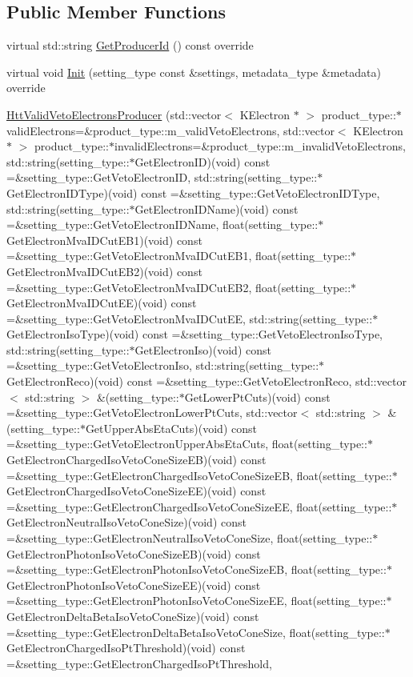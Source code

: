 \subsection*{Public Member Functions}
\begin{DoxyCompactItemize}
\item 
virtual std::string \hyperlink{classHttValidVetoElectronsProducer_a5ac4a1b91978488bbf96d66445f641d7}{GetProducerId} () const override
\item 
virtual void \hyperlink{classHttValidVetoElectronsProducer_acba0b3d8e9aad0dda1c8f438b51cc262}{Init} (setting\_\-type const \&settings, metadata\_\-type \&metadata) override
\item 
\hyperlink{classHttValidVetoElectronsProducer_adf09be7406866bc98bbb79f9a73809d5}{HttValidVetoElectronsProducer} (std::vector$<$ KElectron $\ast$ $>$ product\_\-type::$\ast$validElectrons=\&product\_\-type::m\_\-validVetoElectrons, std::vector$<$ KElectron $\ast$ $>$ product\_\-type::$\ast$invalidElectrons=\&product\_\-type::m\_\-invalidVetoElectrons, std::string(setting\_\-type::$\ast$GetElectronID)(void) const =\&setting\_\-type::GetVetoElectronID, std::string(setting\_\-type::$\ast$GetElectronIDType)(void) const =\&setting\_\-type::GetVetoElectronIDType, std::string(setting\_\-type::$\ast$GetElectronIDName)(void) const =\&setting\_\-type::GetVetoElectronIDName, float(setting\_\-type::$\ast$GetElectronMvaIDCutEB1)(void) const =\&setting\_\-type::GetVetoElectronMvaIDCutEB1, float(setting\_\-type::$\ast$GetElectronMvaIDCutEB2)(void) const =\&setting\_\-type::GetVetoElectronMvaIDCutEB2, float(setting\_\-type::$\ast$GetElectronMvaIDCutEE)(void) const =\&setting\_\-type::GetVetoElectronMvaIDCutEE, std::string(setting\_\-type::$\ast$GetElectronIsoType)(void) const =\&setting\_\-type::GetVetoElectronIsoType, std::string(setting\_\-type::$\ast$GetElectronIso)(void) const =\&setting\_\-type::GetVetoElectronIso, std::string(setting\_\-type::$\ast$GetElectronReco)(void) const =\&setting\_\-type::GetVetoElectronReco, std::vector$<$ std::string $>$ \&(setting\_\-type::$\ast$GetLowerPtCuts)(void) const =\&setting\_\-type::GetVetoElectronLowerPtCuts, std::vector$<$ std::string $>$ \&(setting\_\-type::$\ast$GetUpperAbsEtaCuts)(void) const =\&setting\_\-type::GetVetoElectronUpperAbsEtaCuts, float(setting\_\-type::$\ast$GetElectronChargedIsoVetoConeSizeEB)(void) const =\&setting\_\-type::GetElectronChargedIsoVetoConeSizeEB, float(setting\_\-type::$\ast$GetElectronChargedIsoVetoConeSizeEE)(void) const =\&setting\_\-type::GetElectronChargedIsoVetoConeSizeEE, float(setting\_\-type::$\ast$GetElectronNeutralIsoVetoConeSize)(void) const =\&setting\_\-type::GetElectronNeutralIsoVetoConeSize, float(setting\_\-type::$\ast$GetElectronPhotonIsoVetoConeSizeEB)(void) const =\&setting\_\-type::GetElectronPhotonIsoVetoConeSizeEB, float(setting\_\-type::$\ast$GetElectronPhotonIsoVetoConeSizeEE)(void) const =\&setting\_\-type::GetElectronPhotonIsoVetoConeSizeEE, float(setting\_\-type::$\ast$GetElectronDeltaBetaIsoVetoConeSize)(void) const =\&setting\_\-type::GetElectronDeltaBetaIsoVetoConeSize, float(setting\_\-type::$\ast$GetElectronChargedIsoPtThreshold)(void) const =\&setting\_\-type::GetElectronChargedIsoPtThreshold, 
\end{DoxyCompactItemize}
